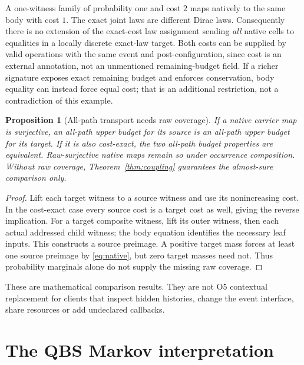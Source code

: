 \documentclass[11pt,a4paper]{article}
\newtheorem{proposition}[theorem]{Proposition}
\theoremstyle{definition}
\begin{document}
A one-witness family of probability one and cost $2$ maps natively to the
same body with cost $1$. The exact joint laws are different Dirac laws.
Consequently there is no extension of the exact-cost law assignment sending
\emph{all} native cells to equalities in a locally discrete exact-law target.
Both costs can be supplied by valid operations with the same event and
post-configuration, since cost is an external annotation, not an unmentioned
remaining-budget field. If a richer signature exposes exact remaining budget
and enforces conservation, body equality can instead force equal cost; that
is an additional restriction, not a contradiction of this example.

\begin{proposition}[All-path transport needs raw coverage]
\label{prop:coverage}
If a native carrier map is surjective, an all-path upper budget for its
source is an all-path upper budget for its target. If it is also cost-exact,
the two all-path budget properties are equivalent. Raw-surjective native
maps remain so under occurrence composition. Without raw coverage,
Theorem~\ref{thm:coupling} guarantees the almost-sure comparison only.
\end{proposition}
\begin{proof}
Lift each target witness to a source witness and use its nonincreasing
cost. In the cost-exact case every source cost is a target cost as well,
giving the reverse implication. For a target composite witness, lift its
outer witness, then each actual addressed child witness; the body equation
identifies the necessary leaf inputs. This constructs a source preimage.
A positive target mass forces at least one source preimage by
\eqref{eq:native}, but zero target masses need not. Thus probability
marginals alone do not supply the missing raw coverage.
\end{proof}
These are mathematical comparison results. They are not O5 contextual
replacement for clients that inspect hidden histories, change the event
interface, share resources or add undeclared callbacks.

\section{The QBS Markov interpretation}\label{sec:qbs}
\end{document}
